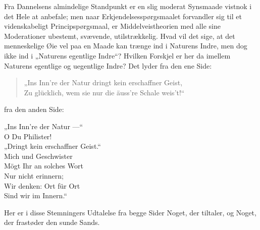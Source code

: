 \documentclass[12pt,a4paper]{book}
\begin{document}
Fra Dannelsens almindelige Standpunkt er en slig moderat Synsmaade
vistnok i det Hele at anbefale; men naar Erkjendelsesspørgsmaalet
forvandler sig til et videnskabeligt Principspørgsmaal, er
Middelveistheorien med alle sine Moderationer ubestemt, svævende,
utilstrækkelig. Hvad vil det sige, at det menneskelige Øie vel paa en
Maade kan trænge ind i Naturens Indre, men dog ikke ind i „Naturens
egentlige Indre“? Hvilken Forskjel er her da imellem Naturens egentlige
og uegentlige Indre? Det lyder fra den ene Side:

\begin{quote}
\noindent „Ins Inn're der Natur dringt kein erschaffner Geist,\\
Zu glücklich, wem sie nur die äuss're Schale weis't!“
\end{quote}

\noindent fra den anden Side:

\begin{center}
„Ins Inn're der Natur ---“\\
O Du Philister!\\
„Dringt kein erschaffner Geist.“\\
Mich und Geschwister\\
Mögt Ihr an solches Wort\\
Nur nicht erinnern;\\
Wir denken: Ort für Ort\\
Sind wir im Innern.“
\end{center}
\setcounter{footnote}{0}
Her er i disse Stemningers Udtalelse fra begge Sider Noget, der tiltaler,
og Noget, der frastøder den sunde Sands.
\end{document}
